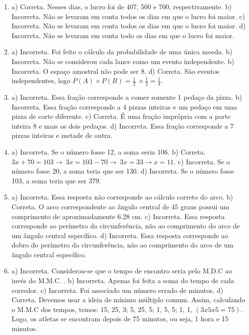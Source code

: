 \begin{enumerate}
\item a) Correta. Nesses dias, o lucro foi de 407, 500 e 700, respectivamente.
b) Incorreta. Não se levaram em conta todos os dias em que o lucro foi maior.
c) Incorreta. Não se levaram em conta todos os dias em que o lucro foi maior.
d) Incorreta. Não se levaram em conta todo os dias em que o lucro foi maior.


\item a) Incorreta. Foi feito o cálculo da probabilidade de uma única moeda.
b) Incorreta. Não se considerou cada lance como um evento independente.
b) Incorreta. O espaço amostral não pode ser 8.
d) Correta. São eventos independentes, logo
$P\left( A \right) \times P\left( B \right) = \frac{1}{2}\  \times \frac{1}{2} = \frac{1}{4}$.


\item a) Incorreta. Essa fração corresponde a comer somente 1 pedaço da pizza.
b) Incorreta. Essa fração corresponde a 4 pizzas inteiras e um pedaço em uma pizza de corte diferente.
c) Correta. É uma fração imprópria com a parte inteira 8 e mais os dois pedaços.
d) Incorreta. Essa fração corresponde a 7 pizzas inteiras e metade de outra.


\item a) Incorreta. Se o número fosse 12, a soma seria 106.
b) Correta. $3x + 70 = 103 \rightarrow \ 3x = 103 - 70 \rightarrow \ 3x = 33 \rightarrow x = 11$.
c) Incorreta. Se o número fosse 20, a soma teria que ser 130.
d) Incorreta. Se o número fosse 103, a soma teria que ser 379.


\item a) Incorreta. Essa resposta não corresponde ao cálculo correto do arco.
b) Correta. O arco correspondente ao ângulo central de 45 graus possui um comprimento de aproximadamente 6.28 cm.
c) Incorreta. Essa resposta corresponde ao perímetro da
circunferência, não ao comprimento do arco de um ângulo central específico.
d) Incorreta. Essa resposta corresponde ao dobro do perímetro da circunferência, não ao comprimento do arco de um ângulo central específico.


\item a) Incorreta. Considerou-se que o tempo de encontro seria pelo M.D.C ao invés do M.M.C. . 
b) Incorreta. Apenas foi feita a soma do
tempo de cada corredor. 
c) Incorreta. Foi associado um número
errado de minutos. 
d) Correta. Devemos usar a ideia de mínimo múltiplo comum. Assim, calculando o M.M.C dos tempos, temos: 15, 25, 3; 5, 25, 5; 1, 5, 5; 1, 1, $(3x5x5 = 75)$. Logo, os atletas se encontram depois de 75 minutos, ou seja, 1 hora e 15 minutos.



\end{enumerate}
